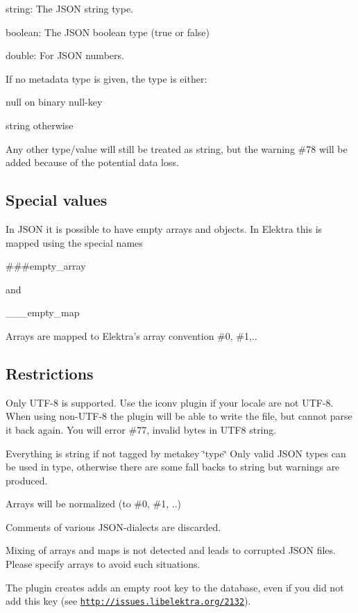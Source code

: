 \begin{DoxyItemize}
\item {\ttfamily string}\+: The J\+S\+ON string type.
\item {\ttfamily boolean}\+: The J\+S\+ON boolean type (true or false)
\item {\ttfamily double}\+: For J\+S\+ON numbers.
\end{DoxyItemize}

If no metadata {\ttfamily type} is given, the type is either\+:


\begin{DoxyItemize}
\item {\ttfamily null} on binary null-\/key
\item {\ttfamily string} otherwise
\end{DoxyItemize}

Any other type/value will still be treated as string, but the warning {\ttfamily \#78} will be added because of the potential data loss.

\subsection*{Special values}

In J\+S\+ON it is possible to have empty arrays and objects. In Elektra this is mapped using the special names \begin{DoxyVerb}###empty_array
\end{DoxyVerb}


and \begin{DoxyVerb}___empty_map
\end{DoxyVerb}


Arrays are mapped to Elektra’s array convention \#0, \#1,..

\subsection*{Restrictions}


\begin{DoxyItemize}
\item Only U\+T\+F-\/8 is supported. Use the {\ttfamily iconv} plugin if your locale are not U\+T\+F-\/8. When using non-\/\+U\+T\+F-\/8 the plugin will be able to write the file, but cannot parse it back again. You will error \#77, invalid bytes in U\+T\+F8 string.
\item Everything is string if not tagged by metakey \char`\"{}type\char`\"{} Only valid J\+S\+ON types can be used in type, otherwise there are some fall backs to string but warnings are produced.
\item Arrays will be normalized (to \#0, \#1, ..)
\item Comments of various J\+S\+O\+N-\/dialects are discarded.
\item Mixing of arrays and maps is not detected and leads to corrupted J\+S\+ON files. Please specify arrays to avoid such situations.
\item The plugin creates adds an empty root key to the database, even if you did not add this key (see \href{http://issues.libelektra.org/2132}{\tt http\+://issues.\+libelektra.\+org/2132}).
\end{DoxyItemize}


